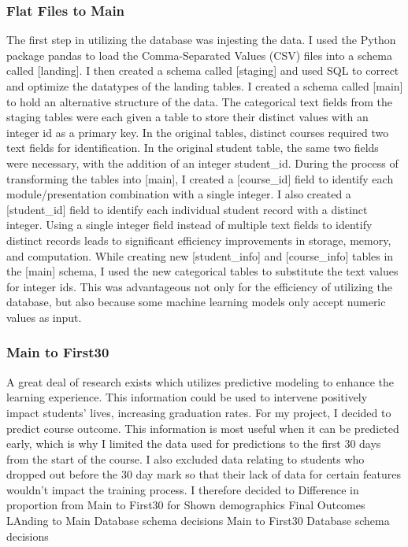 \documentclass{article}
\begin{document}
            \subsubsection{Flat Files to Main}
                The first step in utilizing the database was injesting the data.
                I used the Python package pandas to load the Comma-Separated Values (CSV) files into a schema called [landing].
                I then created a schema called [staging] and used SQL to correct and optimize the datatypes of the landing tables.       
                I created a schema called [main] to hold an alternative structure of the data.
                \newline
                The categorical text fields from the staging tables were each given a table to store their distinct values with an integer id as a primary key.
                In the original tables, distinct courses required two text fields for identification.
                In the original student table, the same two fields were necessary, with the addition of an integer student\_id. 
                During the process of transforming the tables into [main], I created a [course\_id] field to identify each module/presentation combination with a single integer.
                I also created a [student\_id] field to identify each individual student record with a distinct integer. 
                Using a single integer field instead of multiple text fields to identify distinct records leads to significant efficiency improvements in storage, memory, and computation.
                While creating new [student\_info] and [course\_info] tables in the [main] schema, I used the new categorical tables to substitute the text values for integer ids.
                This was advantageous not only for the efficiency of utilizing the database, but also because some machine learning models only accept numeric values as input.

            \subsubsection{Main to First30}
                A great deal of research exists which utilizes predictive modeling to enhance the learning experience.
                This information could be used to intervene positively impact students' lives, increasing graduation rates.
                For my project, I decided to predict course outcome.
                This information is most useful when it can be predicted early, which is why I limited the data used for predictions to the first 30 days from the start of the course.
                I also excluded data relating to students who dropped out before the 30 day mark so that their lack of data for certain features wouldn't impact the training process.
                \newline
                I therefore decided to 
                Difference in proportion from Main to First30 for 
                Shown demographics
                Final Outcomes
                LAnding to Main Database schema decisions
                Main to First30 Database schema decisions
\end{document}
